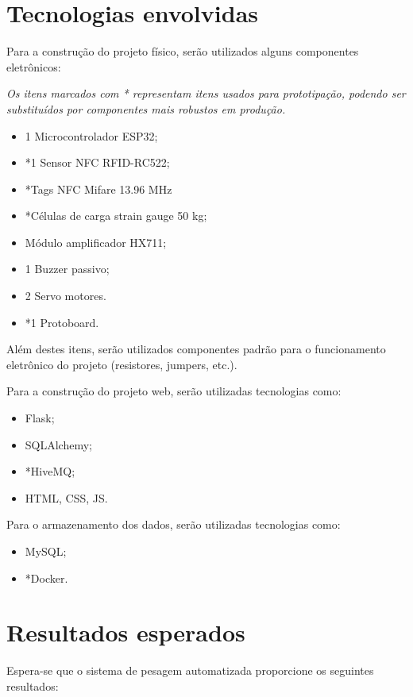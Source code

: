 \documentclass[11pt]{article}
\begin{document}
\section{Tecnologias envolvidas}
Para a construção do projeto físico, serão utilizados alguns componentes eletrônicos:

\textit{Os itens marcados com * representam itens usados para prototipação, podendo ser substituídos por componentes mais robustos em produção.}

\begin{itemize}
    \item 1 Microcontrolador ESP32;
    \item *1 Sensor NFC RFID-RC522;
    \item *Tags NFC Mifare 13.96 MHz
    \item *Células de carga strain gauge 50 kg;
    \item Módulo amplificador HX711;
    \item 1 Buzzer passivo;
    \item 2 Servo motores.
    \item *1 Protoboard.
\end{itemize}

Além destes itens, serão utilizados componentes padrão para o funcionamento eletrônico do projeto (resistores, jumpers, etc.).

Para a construção do projeto web, serão utilizadas tecnologias como:
\begin{itemize}
    \item Flask;
    \item SQLAlchemy;
    \item *HiveMQ;
    \item HTML, CSS, JS.
\end{itemize}

Para o armazenamento dos dados, serão utilizadas tecnologias como:
\begin{itemize}
    \item MySQL;
    \item *Docker.
\end{itemize}


\section{Resultados esperados}
Espera-se que o sistema de pesagem automatizada proporcione os seguintes resultados:
\end{document}

